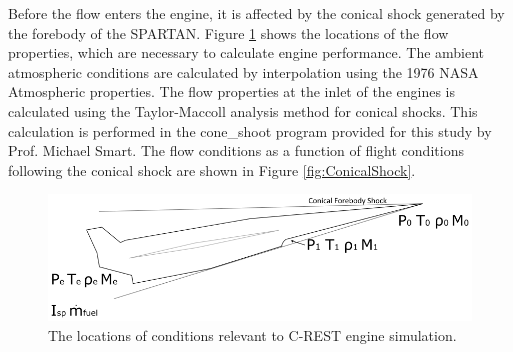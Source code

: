 Before the flow enters the engine, it is affected by the conical shock generated by the forebody of the SPARTAN.
Figure \ref{fig:SPARTANEngineshock} shows the locations of the flow properties, which are necessary to calculate engine performance. The ambient atmospheric conditions are calculated by interpolation using the 1976 NASA Atmospheric properties\cite{Administration1976}.
The flow properties at the inlet of the engines is calculated using the Taylor-Maccoll analysis method for conical shocks\cite{TaylorMaccoll}. This calculation is performed in the cone\_shoot program provided for this study by Prof. Michael Smart. The flow conditions as a function of flight conditions following the conical shock are shown in Figure \ref{fig:ConicalShock}.  

\begin{figure}[ht]
\centering
\includegraphics[width=0.7\linewidth]{figures/3_vehicle_design/SPARTANEngineshock}
\caption{The locations of conditions relevant to C-REST engine simulation. }
\label{fig:SPARTANEngineshock}
\end{figure}


